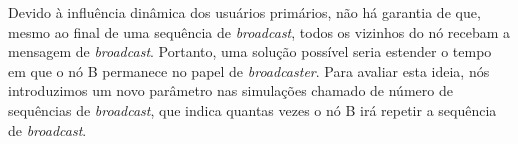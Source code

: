 
Devido à influência dinâmica dos usuários primários, não há garantia de que, mesmo ao final de uma sequência de {\it broadcast}, todos os vizinhos do nó recebam a mensagem de {\it broadcast}. Portanto, uma solução possível seria estender o tempo em que o nó B permanece no papel de {\it broadcaster}. Para avaliar esta ideia, nós introduzimos um novo parâmetro nas simulações chamado de número de sequências de {\it broadcast}, que indica quantas vezes o nó B irá repetir a sequência de {\it broadcast}.%


